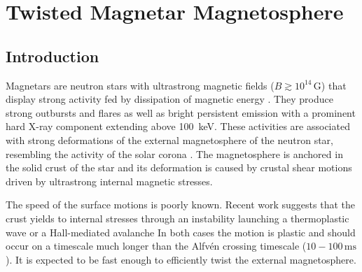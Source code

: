 
\chapter{Twisted Magnetar Magnetosphere}

\section{Introduction}

Magnetars are neutron stars with ultrastrong magnetic fields ($B \gtrsim
10^{14}\,\mathrm{G}$) that display  strong activity fed by dissipation of magnetic energy
\citetext{see e.g. \citealp{mereghetti_2008}; \citealp{2015RPPh...78k6901T} for reviews}.
They produce strong outbursts and flares as well as bright persistent emission
with a prominent hard X-ray component extending above 100~keV.
These activities are associated with strong
deformations of the external magnetosphere of the neutron star, resembling the activity
of the solar corona
\citep[e.g.][]{1995MNRAS.275..255T}.
The magnetosphere is anchored in the solid crust of the star and its deformation
is caused by crustal shear motions driven by ultrastrong internal magnetic
stresses.

The speed of the surface motions is poorly known. Recent work suggests that
the crust yields to internal stresses through an instability launching a
thermoplastic wave
\citep{2014ApJ...794L..24B}
or a Hall-mediated avalanche
\citep{2016arXiv160604895L}
In both cases the motion is plastic and should occur on a timescale much longer
than the Alfv\'en crossing timescale ($10-100\,\mathrm{ms}$).
It is expected to be fast enough to efficiently twist the external magnetosphere.

